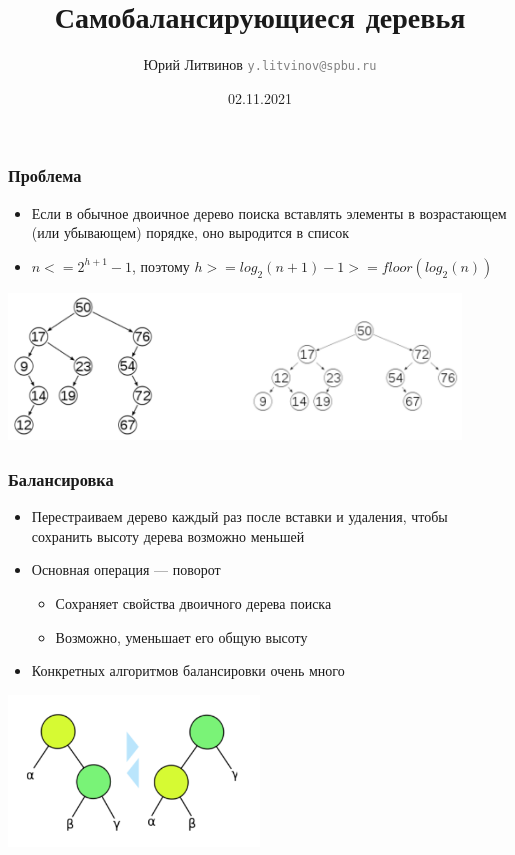 \documentclass[xetex,mathserif,serif]{beamer}
\title{Самобалансирующиеся деревья}
\author[Юрий Литвинов]{Юрий Литвинов \newline \textcolor{gray}{\small\texttt{y.litvinov@spbu.ru}}}
\date{02.11.2021}
\begin{document}
    \frame{\titlepage}

    \begin{frame}
        \frametitle{Проблема}
        \begin{itemize}
            \item Если в обычное двоичное дерево поиска вставлять элементы в возрастающем (или убывающем) порядке, оно выродится в список
            \item $n <= 2^{h + 1} - 1$, поэтому $h >= log_2(n + 1) - 1 >= floor(log_2(n))$
        \end{itemize}
        \begin{center}
            \includegraphics[width=0.9\textwidth]{tree-problem.png}
        \end{center}
    \end{frame}

    \begin{frame}
        \frametitle{Балансировка}
        \begin{itemize}
            \item Перестраиваем дерево каждый раз после вставки и удаления, чтобы сохранить высоту дерева возможно меньшей
            \item Основная операция --- поворот
            \begin{itemize}
                \item Сохраняет свойства двоичного дерева поиска
                \item Возможно, уменьшает его общую высоту
            \end{itemize}
            \item Конкретных алгоритмов балансировки очень много
        \end{itemize}
        \begin{center}
            \includegraphics[width=0.5\textwidth]{balancing.png}
        \end{center}
    \end{frame}
\end{document}
